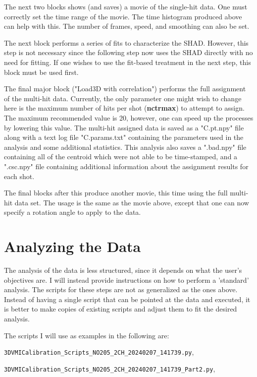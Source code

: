 \documentclass[12pt]{article}
\begin{document}
The next two blocks shows (and saves) a movie of the single-hit data.
One must correctly set the time range of the movie.
The time histogram produced above can help with this.
The number of frames, speed, and smoothing can also be set.

The next block performs a series of fits to characterize the SHAD.
However, this step is not necessary since the following step now uses the SHAD directly with no need for fitting.
If one wishes to use the fit-based treatment in the next step, this block must be used first.

The final major block ("Load3D with correlation") performs the full assignment of the multi-hit data.
Currently, the only parameter one might wish to change here is the maximum number of hits per shot (\textbf{nctrmax}) to attempt to assign.
The maximum recommended value is 20, however, one can speed up the processes by lowering this value.
The multi-hit assigned data is saved as a "C.pt.npy" file along with a text log file "C.params.txt" containing the parameters used in the analysis and some additional statistics.
This analysis also saves a ".bad.npy" file containing all of the centroid which were not able to be time-stamped, and a ".csc.npy" file containing additional information about the assignment results for each shot.

The final blocks after this produce another movie, this time using the full multi-hit data set.
The usage is the same as the movie above, except that one can now specify a rotation angle to apply to the data.

\section{Analyzing the Data}

The analysis of the data is less structured, since it depends on what the user's objectives are.
I will instead provide instructions on how to perform a 'standard' analysis.
The scripts for these steps are not as generalized as the ones above.
Instead of having a single script that can be pointed at the data and executed, it is better to make copies of existing scripts and adjust them to fit the desired analysis.

The scripts I will use as examples in the following are:

\noindent
\texttt{3DVMICalibration\_Scripts\_NO205\_2CH\_20240207\_141739.py},

\noindent
\texttt{3DVMICalibration\_Scripts\_NO205\_2CH\_20240207\_141739\_Part2.py}, 
\end{document}
